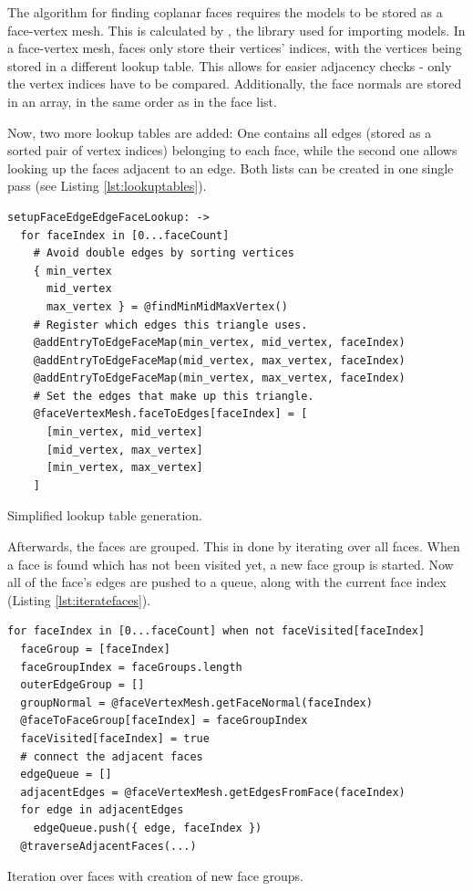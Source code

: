 \documentclass[../ClassicThesis.tex]{subfiles}
\begin{document}
The algorithm for finding coplanar faces requires the models to be stored as a face-vertex mesh. This is calculated by \meshlib, the library used for importing models. In a face-vertex mesh, faces only store their vertices' indices, with the vertices being stored in a different lookup table. This allows for easier adjacency checks - only the vertex indices have to be compared. Additionally, the face normals are stored in an array, in the same order as in the face list.

Now, two more lookup tables are added: One contains all edges (stored as a sorted pair of vertex indices) belonging to each face, while the second one allows looking up the faces adjacent to an edge. Both lists can be created in one single pass (see Listing \ref{lst:lookuptables}). 

\begin{listing}
\begin{verbatim}
setupFaceEdgeEdgeFaceLookup: ->
  for faceIndex in [0...faceCount]
    # Avoid double edges by sorting vertices
    { min_vertex
      mid_vertex
      max_vertex } = @findMinMidMaxVertex()
    # Register which edges this triangle uses.
    @addEntryToEdgeFaceMap(min_vertex, mid_vertex, faceIndex)
    @addEntryToEdgeFaceMap(mid_vertex, max_vertex, faceIndex)
    @addEntryToEdgeFaceMap(min_vertex, max_vertex, faceIndex)
    # Set the edges that make up this triangle.
    @faceVertexMesh.faceToEdges[faceIndex] = [
      [min_vertex, mid_vertex]
      [mid_vertex, max_vertex]
      [min_vertex, max_vertex]
    ]
\end{verbatim}
\caption{Simplified lookup table generation.}
\label{lst:lookuptables}
\end{listing}

Afterwards, the faces are grouped. This in done by iterating over all faces. When a face is found which has not been visited yet, a new face group is started. Now all of the face's edges are pushed to a queue, along with the current face index (Listing \ref{lst:iteratefaces}).

\begin{listing}
\begin{verbatim}
for faceIndex in [0...faceCount] when not faceVisited[faceIndex]
  faceGroup = [faceIndex]
  faceGroupIndex = faceGroups.length
  outerEdgeGroup = []
  groupNormal = @faceVertexMesh.getFaceNormal(faceIndex)
  @faceToFaceGroup[faceIndex] = faceGroupIndex
  faceVisited[faceIndex] = true
  # connect the adjacent faces
  edgeQueue = []
  adjacentEdges = @faceVertexMesh.getEdgesFromFace(faceIndex)
  for edge in adjacentEdges
    edgeQueue.push({ edge, faceIndex })
  @traverseAdjacentFaces(...)
\end{verbatim}
\caption{Iteration over faces with creation of new face groups.}
\label{lst:iteratefaces}
\end{listing}
\end{document}
